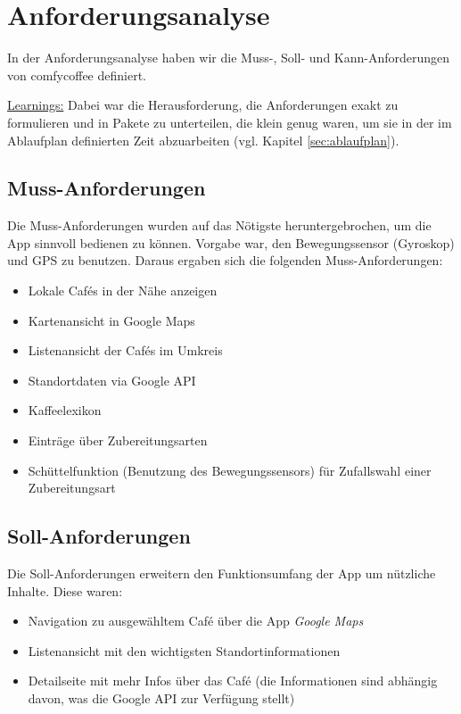 \section{Anforderungsanalyse}
In der Anforderungsanalyse haben wir die Muss-, Soll- und Kann-Anforderungen von comfycoffee definiert.

\underline{Learnings:}
Dabei war die Herausforderung, die Anforderungen exakt zu formulieren und in Pakete zu unterteilen, die klein genug waren, um sie in der im Ablaufplan definierten Zeit abzuarbeiten (vgl. Kapitel \ref{sec:ablaufplan}).


\subsection{Muss-Anforderungen}
\label{subsec:mussanforderungen}
Die Muss-Anforderungen wurden auf das Nötigste heruntergebrochen, um die App sinnvoll bedienen zu können. Vorgabe war, den Bewegungssensor (Gyroskop) und GPS zu benutzen. Daraus ergaben sich die folgenden Muss-Anforderungen:

\begin{itemize}
	\item Lokale Cafés in der Nähe anzeigen
	\item Kartenansicht in Google Maps
	\item Listenansicht der Cafés im Umkreis
	\item Standortdaten via Google API
	\item Kaffeelexikon
	\item Einträge über Zubereitungsarten
	\item Schüttelfunktion (Benutzung des Bewegungssensors) für Zufallswahl einer Zubereitungsart
\end{itemize}

\subsection{Soll-Anforderungen}
Die Soll-Anforderungen erweitern den Funktionsumfang der App um nützliche Inhalte. Diese waren:

\begin{itemize}
	\item Navigation zu ausgewähltem Café über die App \emph{Google Maps}
	\item Listenansicht mit den wichtigsten Standortinformationen
	\item Detailseite mit mehr Infos über das Café (die Informationen sind abhängig davon, was die Google API zur Verfügung stellt)
\end{itemize}

